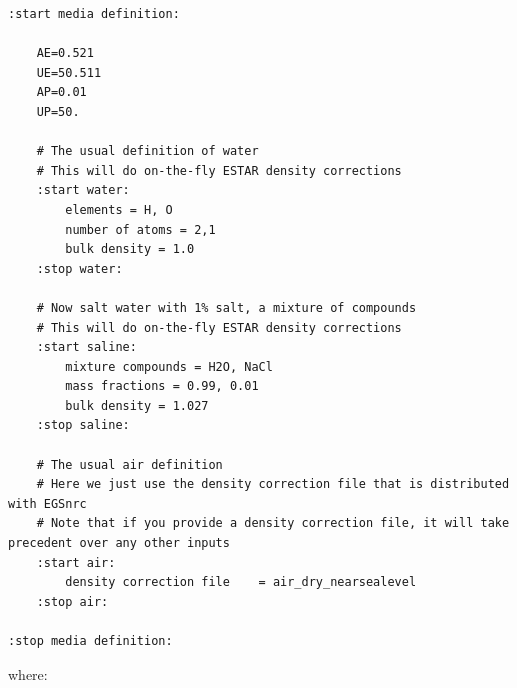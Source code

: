 \begin{verbatim}
:start media definition:

    AE=0.521
    UE=50.511
    AP=0.01
    UP=50.

    # The usual definition of water
    # This will do on-the-fly ESTAR density corrections
    :start water:
        elements = H, O
        number of atoms = 2,1
        bulk density = 1.0
    :stop water:

    # Now salt water with 1% salt, a mixture of compounds
    # This will do on-the-fly ESTAR density corrections
    :start saline:
        mixture compounds = H2O, NaCl
        mass fractions = 0.99, 0.01
        bulk density = 1.027
    :stop saline:

    # The usual air definition
    # Here we just use the density correction file that is distributed with EGSnrc
    # Note that if you provide a density correction file, it will take precedent over any other inputs
    :start air:
        density correction file    = air_dry_nearsealevel
    :stop air:

:stop media definition:
\end{verbatim}
where:
